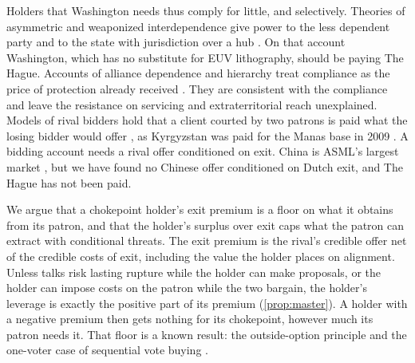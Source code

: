 Holders that Washington needs thus comply for little, and selectively. Theories of asymmetric and weaponized interdependence give power to the less dependent party and to the state with jurisdiction over a hub \citep{hirschman1945national, keohane1977power, farrell2019weaponized}. On that account Washington, which has no substitute for EUV lithography, should be paying The Hague. Accounts of alliance dependence and hierarchy treat compliance as the price of protection already received \citep{morrow1991alliances, lake2009hierarchy}. They are consistent with the compliance and leave the resistance on servicing and extraterritorial reach unexplained. Models of rival bidders hold that a client courted by two patrons is paid what the losing bidder would offer \citep{groseclose1996buying, bueno2016competition}, as Kyrgyzstan was paid for the Manas base in 2009 \citep{cooley2012great}. A bidding account needs a rival offer conditioned on exit. China is ASML's largest market \citep{asml2026annual}, but we have found no Chinese offer conditioned on Dutch exit, and The Hague has not been paid.

We argue that a chokepoint holder's exit premium is a floor on what it obtains from its patron, and that the holder's surplus over exit caps what the patron can extract with conditional threats. The exit premium is the rival's credible offer net of the credible costs of exit, including the value the holder places on alignment. Unless talks risk lasting rupture while the holder can make proposals, or the holder can impose costs on the patron while the two bargain, the holder's leverage is exactly the positive part of its premium (\cref{prop:master}). A holder with a negative premium then gets nothing for its chokepoint, however much its patron needs it. That floor is a known result: the outside-option principle \citep{shaked1984involuntary, sutton1986noncooperative, binmore1989outside} and the one-voter case of sequential vote buying \citep{groseclose1996buying, dekel2008vote}.

